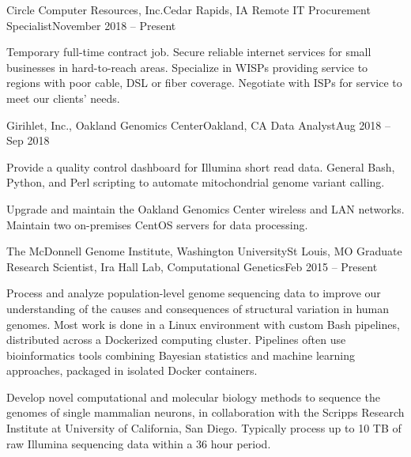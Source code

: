     	    \resumeSubheading
	    {Circle Computer Resources, Inc.}{Cedar Rapids, IA}
	    {Remote IT Procurement Specialist}{November 2018 -- Present}
	    
	    \resumeItemListStart
	    
		{Temporary full-time contract job. Secure reliable internet services for small businesses in hard-to-reach areas. Specialize in WISPs providing service to regions with poor cable, DSL or fiber coverage. Negotiate with ISPs for service to meet our clients' needs.}
		
	\resumeItemListEnd
	
	    \resumeSubheading
	    {Girihlet, Inc., Oakland Genomics Center}{Oakland, CA}
	    {Data Analyst}{Aug 2018 -- Sep 2018}
	    
	    \resumeItemListStart
	    
	    	{Provide a quality control dashboard for Illumina short read data. General Bash, Python, and Perl scripting to automate mitochondrial genome variant calling.}
	    		
	    	{Upgrade and maintain the Oakland Genomics Center wireless and LAN networks. Maintain two on-premises CentOS servers for data processing.}
		
	\resumeItemListEnd
     
        \resumeSubheading
        {The McDonnell Genome Institute, Washington University}{St Louis, MO}
        {Graduate Research Scientist, Ira Hall Lab, Computational Genetics}{Feb 2015 -- Present}

        \resumeItemListStart

            {Process and analyze population-level genome sequencing data to improve our understanding of the causes and consequences of structural variation in human genomes. Most work is done in a Linux environment with custom Bash pipelines, distributed across a Dockerized computing cluster. Pipelines often use bioinformatics tools combining Bayesian statistics and machine learning approaches, packaged in isolated Docker containers.}
            
            {Develop novel computational and molecular biology methods to sequence the genomes of single mammalian neurons, in collaboration with the Scripps Research Institute at University of California, San Diego. Typically process up to 10 TB of raw Illumina sequencing data within a 36 hour period.}
            
